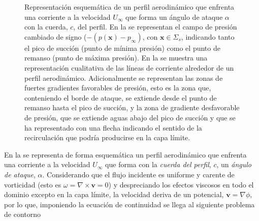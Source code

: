 \begin{figure}[hbtp!]
\centering
{}
\caption{Representación esquemática de un perfil aerodinámico que enfrenta una corriente a la velocidad $U_{\infty} $ que forma un ángulo de ataque $\alpha$ con la cuerda, $c$, del perfil. En la  se representan el campo de presión cambiado de signo ($-(p(\mathbf{x})-p_{\infty})$, con $\mathbf{x}\in \Sigma_{s}$, indicando  tanto el pico de succión (punto de mínima presión) como el punto de remanso (punto de máxima presión). En la  se muestra una representación cualitativa de las líneas de corriente alrededor de un perfil aerodinámico. Adicionalmente se representan las zonas de fuertes gradientes favorables de presión, esto es la zona que, conteniendo el borde de ataque, se extiende desde el punto de remanso hasta el pico de succión, y la zona de gradiente desfavorable de presión, que se extiende aguas abajo del pico de succión y que se ha representado con una flecha indicando el sentido de la recirculación que podría producirse en la capa límite.}
\end{figure}

En la  se representa de forma esquemática un perfil aerodinámico que enfrenta una corriente a la velocidad $U_{\infty}$ que forma con la \emph{cuerda del perfil}, $c$, un \emph{ángulo de ataque}, $\alpha$. Considerando que el flujo incidente es uniforme y carente de vorticidad (esto es $\omega = \nabla \times \mathbf{v} = 0$) y despreciando los efectos viscosos en todo el dominio excepto en la capa límite, la velocidad deriva de un potencial, $\mathbf{v} = \nabla \phi$, por lo que, imponiendo la ecuación de continuidad se llega al siguiente problema de contorno

